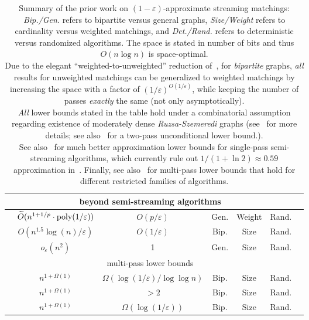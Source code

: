 \documentclass{theoretics}
\newcommand{\Ot}{\widetilde{O}}
\newcommand{\eps}{\varepsilon}
\newcommand{\poly}{\mbox{\rm poly}}
\begin{document}
\begin{table}[h!]
{\begin{tabular}{|c | c | c | c | c | c | c |}
   \hline\hline
  \multicolumn{6}{|c|}{beyond semi-streaming algorithms} \\
  \hline\hline
  \cite{AhnG15} & $\Ot(n^{1+1/p} \cdot \poly{(1/\eps)})$ & $O(p/\eps)$ & Gen. & Weight & Rand. \\
  \hline
  \cite{BehnezhadDETY17} & $O(n^{1.5}\log{\!(n)}/\eps)$ & $O(1/\eps)$ & Bip. & Size & Rand. \\
    \hline
  \cite{AssadiBKL23} & $o_{\eps}(n^2)$ & 1 & Gen. & Size & Rand. \\
   \hline\hline
  \multicolumn{6}{|c|}{multi-pass lower bounds} \\
\hline\hline  
 \cite{ChenKPSSY21} & $n^{1+\Omega(1)}$ & $\Omega({\log{(1/\eps)}}/{\log\log{n}})$ & Bip. & Size & Rand. \\
\hline
\cite{Assadi22} & $n^{1+\Omega(1)}$ & $>2$  & Bip. & Size & Rand. \\
\hline
\cite{AssadiS23} & $n^{1+\Omega(1)}$ & $\Omega(\log{(1/\eps)})$ &Bip. & Size & Rand. \\
\hline
\end{tabular}
}
\caption{\footnotesize Summary of the prior work on $(1-\eps)$-approximate streaming matchings: \emph{Bip./Gen.} refers to bipartite versus general graphs, \emph{Size/Weight} refers to cardinality versus weighted matchings, and \emph{Det./Rand.} refers to deterministic versus randomized algorithms. The space is stated in number of bits and thus $O(n\log{n})$ is space-optimal.\\ 
Due to the elegant ``weighted-to-unweighted'' reduction of~\cite{BernsteinDL21}, for \emph{bipartite} graphs, \emph{all} results for unweighted matchings can be generalized to weighted matchings by increasing the space with a factor of $(1/\eps)^{O(1/\eps)}$, 
while keeping the number of passes \emph{exactly} the same (not only asymptotically). \\ 
\emph{All}  lower bounds stated in the table hold under a combinatorial assumption regarding existence of moderately dense \emph{Ruzsa-Szemeredi} graphs (see~\cite{Assadi22,AssadiS23} for more details; see also~\cite{KonradN24}
for a two-pass unconditional lower bound.). \\
See also~\cite{GoelKK12,Kapralov13,Kapralov21} for much better approximation lower bounds for single-pass semi-streaming algorithms, which currently rule out $1/(1+\ln{2})\approx 0.59$ approximation in~\cite{Kapralov21}. 
Finally, see also~\cite{KhalilK20,KonradN21,KonradNS23} for multi-pass lower bounds that hold for different restricted families of algorithms.
}\label{tab:results}
\end{table} 
\end{document}
